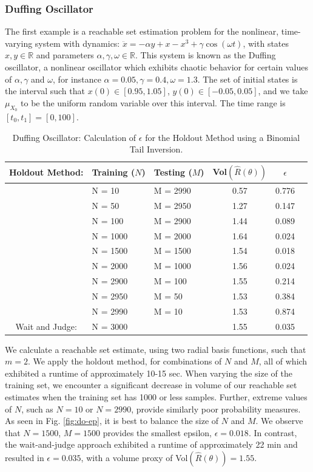 \documentclass[letterpaper, 10 pt, conference]{ieeeconf}  %
\begin{document}
\subsubsection{Duffing Oscillator}
The first example is a reachable set estimation problem for the nonlinear, time-varying system with dynamics: $\ddot{x} =  -\alpha y + x -x^3 + \gamma \cos(\omega t)$, with states $x, y \in \mathbb{R}$ and parameters $\alpha, \gamma, \omega \in \mathbb{R}$. This system is known as the Duffing oscillator, a nonlinear oscillator which exhibits chaotic behavior for certain values of $\alpha, \gamma$ and $\omega$, for instance $\alpha = 0.05, \gamma = 0.4, \omega = 1.3 $. The set of initial states is the interval such that $x(0) \in [0.95, 1.05]$, $y(0) \in [-0.05, 0.05]$, and we take $\mu_{X_0}$ to be the uniform random variable over this interval. The time range is $[t_0, t_1] = [0, 100]$.

\begin{table}[h]\centering
\caption{\normalfont \small Duffing Oscillator: Calculation of $\epsilon$ for the Holdout Method using a Binomial Tail Inversion. 
}
\begin{tabular}{@{}cllccc@{}}
\toprule
Holdout Method:& Training ($N$) & Testing ($M$) & Vol$(\hat{R}(\theta))$ & $\epsilon$  \\ \midrule \midrule
& N = 10 & M = 2990 & 0.57 & 0.776 \\ 
& N = 50 & M = 2950 & 1.27 & 0.147 \\ 
& N = 100 & M = 2900 & 1.44 & 0.089 \\ 
& N = 1000 & M = 2000 & 1.64 & 0.024 \\
& N = 1500 & M = 1500 & 1.54 & 0.018 \\
& N = 2000 & M = 1000 & 1.56 & 0.024 \\ 
& N = 2900 & M = 100 & 1.55 & 0.214 \\ 
& N = 2950 & M = 50 & 1.53 & 0.384 \\
& N = 2990 & M = 10 & 1.53 & 0.874 \\ 
\midrule \midrule
Wait and Judge: & N = 3000 &  & 1.55 & 0.035  \\ 
\bottomrule
\end{tabular}
\label{table:duffing-rbf}
\end{table}
We calculate a reachable set estimate, using two radial basis functions, such that $m = 2$. We apply the holdout method, for combinations of $N$ and $M$, all of which exhibited a runtime of approximately 10-15 sec. When varying the size of the training set, we encounter a significant decrease in volume of our reachable set estimates when the training set has 1000 or less samples. Further, extreme values of $N$, such as $N=10$ or $N=2990$, provide similarly poor probability measures. As seen in Fig. \ref{fig:do-ep}, it is best to balance the size of $N$ and $M$. We observe that $N=1500$, $M=1500$ provides the smallest epsilon, $\epsilon = 0.018$.
In contrast, the wait-and-judge approach exhibited a runtime of approximately 22 min and resulted in $\epsilon = 0.035$, with a volume proxy of Vol$(\hat{R}(\theta)) = 1.55$.   
\end{document}

